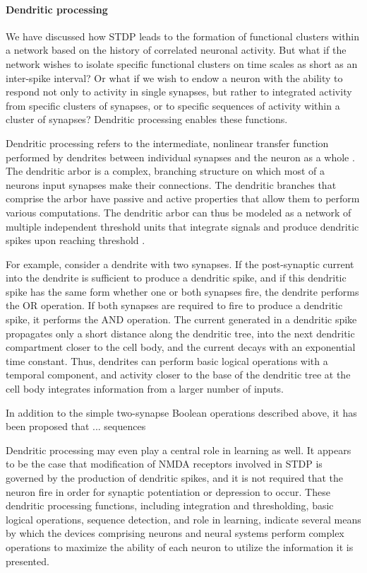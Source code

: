 \documentclass[twocolumn]{article}
\begin{document}
\paragraph{Dendritic processing}
We have discussed how STDP leads to the formation of functional clusters within a network based on the history of correlated neuronal activity. But what if the network wishes to isolate specific functional clusters on time scales as short as an inter-spike interval? Or what if we wish to endow a neuron with the ability to respond not only to activity in single synapses, but rather to integrated activity from specific clusters of synapses, or to specific sequences of activity within a cluster of synapses? Dendritic processing enables these functions.

Dendritic processing refers to the intermediate, nonlinear transfer function performed by dendrites between individual synapses and the neuron as a whole \cite{stsp2015}. The dendritic arbor is a complex, branching structure on which most of a neurons input synapses make their connections. The dendritic branches that comprise the arbor have passive and active properties that allow them to perform various computations. The dendritic arbor can thus be modeled as a network of multiple independent threshold units that integrate signals and produce dendritic spikes upon reaching threshold \cite{sava2017}.

For example, consider a dendrite with two synapses. If the post-synaptic current into the dendrite is sufficient to produce a dendritic spike, and if this dendritic spike has the same form whether one or both synapses fire, the dendrite performs the OR operation. If both synapses are required to fire to produce a dendritic spike, it performs the AND operation. The current generated in a dendritic spike propagates only a short distance along the dendritic tree, into the next dendritic compartment closer to the cell body, and the current decays with an exponential time constant. Thus, dendrites can perform basic logical operations with a temporal component, and activity closer to the base of the dendritic tree at the cell body integrates information from a larger number of inputs. 

In addition to the simple two-synapse Boolean operations described above, it has been proposed that ... sequences 

Dendritic processing may even play a central role in learning as well. It appears to be the case that modification of NMDA receptors involved in STDP is governed by the production of dendritic spikes, and it is not required that the neuron fire in order for synaptic potentiation or depression to occur. These dendritic processing functions, including integration and thresholding, basic logical operations, sequence detection, and role in learning, indicate several means by which the devices comprising neurons and neural systems perform complex operations to maximize the ability of each neuron to utilize the information it is presented. 
\end{document}
